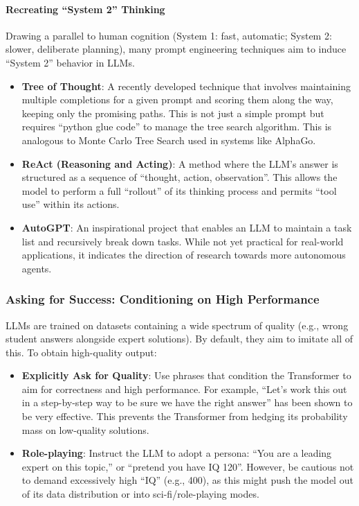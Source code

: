 \paragraph{Recreating ``System 2'' Thinking}
Drawing a parallel to human cognition (System 1: fast, automatic; System 2: slower, deliberate planning), many prompt engineering techniques aim to induce ``System 2'' behavior in LLMs.
\begin{itemize}
    \item \textbf{Tree of Thought}: A recently developed technique that involves maintaining multiple completions for a given prompt and scoring them along the way, keeping only the promising paths. This is not just a simple prompt but requires ``python glue code'' to manage the tree search algorithm. This is analogous to Monte Carlo Tree Search used in systems like AlphaGo.
    \item \textbf{ReAct (Reasoning and Acting)}: A method where the LLM's answer is structured as a sequence of ``thought, action, observation''. This allows the model to perform a full ``rollout'' of its thinking process and permits ``tool use'' within its actions.
    \item \textbf{AutoGPT}: An inspirational project that enables an LLM to maintain a task list and recursively break down tasks. While not yet practical for real-world applications, it indicates the direction of research towards more autonomous agents.
\end{itemize}

\subsubsection{Asking for Success: Conditioning on High Performance}

LLMs are trained on datasets containing a wide spectrum of quality (e.g., wrong student answers alongside expert solutions). By default, they aim to imitate all of this. To obtain high-quality output:
\begin{itemize}
    \item \textbf{Explicitly Ask for Quality}: Use phrases that condition the Transformer to aim for correctness and high performance. For example, ``Let's work this out in a step-by-step way to be sure we have the right answer'' has been shown to be very effective. This prevents the Transformer from hedging its probability mass on low-quality solutions.
    \item \textbf{Role-playing}: Instruct the LLM to adopt a persona: ``You are a leading expert on this topic,'' or ``pretend you have IQ 120''. However, be cautious not to demand excessively high ``IQ'' (e.g., 400), as this might push the model out of its data distribution or into sci-fi/role-playing modes.
\end{itemize}

